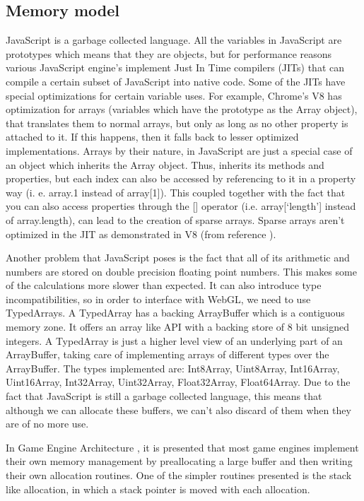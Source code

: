 \subsection{Memory model}

JavaScript is a garbage collected language. All the variables in JavaScript are prototypes which means that they are objects, but for performance reasons various JavaScript engine’s implement Just In Time compilers (JITs) that can compile a certain subset of JavaScript into native code. Some of the JITs have special optimizations for certain variable uses. For example, Chrome’s V8 has optimization for arrays (variables which have the prototype as the Array object), that translates them to normal arrays, but only as long as no other property is attached to it. If this happens, then it falls back to lesser optimized implementations. Arrays by their nature, in JavaScript are just a special case of an object which inherits the Array object. Thus, inherits its methods and properties, but each index can also be accessed by referencing to it in a property way (i. e. array.1 instead of array[1]). This coupled together with the fact that you can also access properties through the [] operator (i.e. array[‘length’] instead of array.length), can lead to the creation of sparse arrays. Sparse arrays aren’t optimized in the JIT as demonstrated in V8 (from reference \cite{clifford12}).

Another problem that JavaScript poses is the fact that all of its arithmetic and numbers are stored on double precision floating point numbers. This makes some of the calculations more slower than expected. It can also introduce type incompatibilities, so in order to interface with WebGL, we need to use TypedArrays. A TypedArray has a backing ArrayBuffer which is a contiguous memory zone. It offers an array like API with a backing store of 8 bit unsigned integers. A TypedArray is just a higher level view of an underlying part of an ArrayBuffer, taking care of implementing arrays of different types over the ArrayBuffer. The types implemented are: Int8Array, Uint8Array, Int16Array, Uint16Array, Int32Array, Uint32Array, Float32Array, Float64Array. Due to the fact that  JavaScript is still a garbage collected language, this means that although we can allocate these buffers, we can’t also discard of them when they are of no more use.

In Game Engine Architecture \cite{gregory09}, it is presented that most game engines implement their own memory management by preallocating a large buffer and then writing their own allocation routines. One of the simpler routines presented is the stack like allocation, in which a stack pointer is moved with each allocation.

